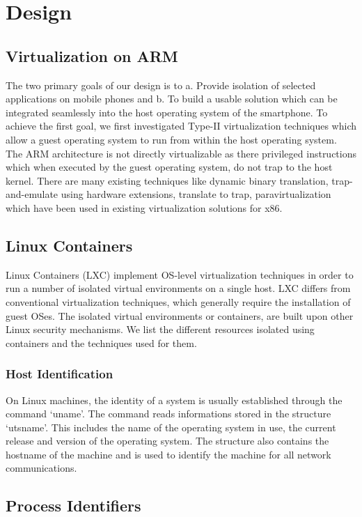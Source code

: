 \section{Design}
\label{sec:design}

\subsection{Virtualization on ARM}
The two primary goals of our design is to a. Provide isolation of selected applications on mobile phones and b. To build a usable solution which can be integrated seamlessly into the host operating system of the smartphone. To achieve the first goal, we first investigated Type-II virtualization techniques which allow a guest operating system to run from within the host operating system. The ARM architecture is not directly virtualizable as there privileged instructions which when executed by the guest operating system, do not trap to the host kernel. There are many existing techniques like dynamic binary translation, trap-and-emulate using hardware extensions, translate to trap, paravirtualization which have been used in existing virtualization solutions for x86.


\subsection{Linux Containers}
Linux Containers (LXC) implement OS-level virtualization techniques in order to run a number of isolated virtual environments on a single host.  LXC differs from conventional virtualization techniques, which generally require the installation of guest OSes.  The isolated virtual environments or containers, are built upon other Linux security mechanisms. We list the different resources isolated using containers and the techniques used for them.

\subsubsection{Host Identification}
On Linux machines, the identity of a system is usually established through the command `uname'. The command reads informations stored in the structure `utsname'. This includes the name of the operating system in use, the current release and version of the operating system. The structure also contains the hostname of the machine and is used to identify the machine for all network communications.

\subsection{Process Identifiers}



